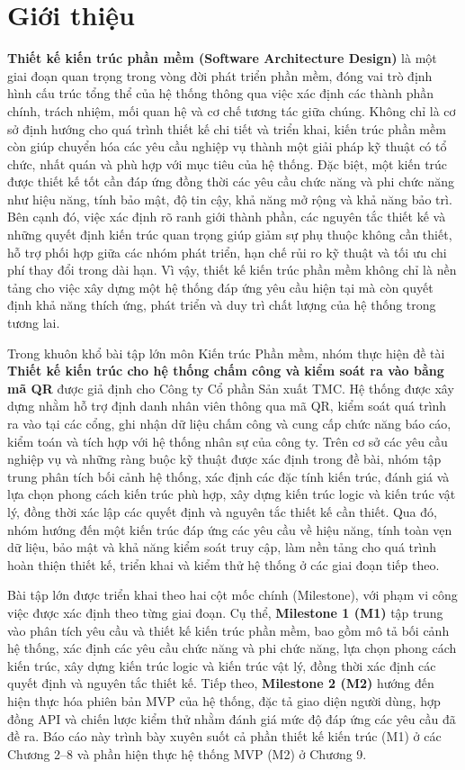 \section{Giới thiệu}

\textbf{Thiết kế kiến trúc phần mềm (Software Architecture Design)} là một giai đoạn quan trọng trong vòng đời phát triển phần mềm, đóng vai trò định hình cấu trúc tổng thể của hệ thống thông qua việc xác định các thành phần chính, trách nhiệm, mối quan hệ và cơ chế tương tác giữa chúng. Không chỉ là cơ sở định hướng cho quá trình thiết kế chi tiết và triển khai, kiến trúc phần mềm còn giúp chuyển hóa các yêu cầu nghiệp vụ thành một giải pháp kỹ thuật có tổ chức, nhất quán và phù hợp với mục tiêu của hệ thống. Đặc biệt, một kiến trúc được thiết kế tốt cần đáp ứng đồng thời các yêu cầu chức năng và phi chức năng như hiệu năng, tính bảo mật, độ tin cậy, khả năng mở rộng và khả năng bảo trì. Bên cạnh đó, việc xác định rõ ranh giới thành phần, các nguyên tắc thiết kế và những quyết định kiến trúc quan trọng giúp giảm sự phụ thuộc không cần thiết, hỗ trợ phối hợp giữa các nhóm phát triển, hạn chế rủi ro kỹ thuật và tối ưu chi phí thay đổi trong dài hạn. Vì vậy, thiết kế kiến trúc phần mềm không chỉ là nền tảng cho việc xây dựng một hệ thống đáp ứng yêu cầu hiện tại mà còn quyết định khả năng thích ứng, phát triển và duy trì chất lượng của hệ thống trong tương lai.

Trong khuôn khổ bài tập lớn môn Kiến trúc Phần mềm, nhóm thực hiện đề tài \textbf{Thiết kế kiến trúc cho hệ thống chấm công và kiểm soát ra vào bằng mã QR} được giả định cho Công ty Cổ phần Sản xuất TMC. Hệ thống được xây dựng nhằm hỗ trợ định danh nhân viên thông qua mã QR, kiểm soát quá trình ra vào tại các cổng, ghi nhận dữ liệu chấm công và cung cấp chức năng báo cáo, kiểm toán và tích hợp với hệ thống nhân sự của công ty. Trên cơ sở các yêu cầu nghiệp vụ và những ràng buộc kỹ thuật được xác định trong đề bài, nhóm tập trung phân tích bối cảnh hệ thống, xác định các đặc tính kiến trúc, đánh giá và lựa chọn phong cách kiến trúc phù hợp, xây dựng kiến trúc logic và kiến trúc vật lý, đồng thời xác lập các quyết định và nguyên tắc thiết kế cần thiết. Qua đó, nhóm hướng đến một kiến trúc đáp ứng các yêu cầu về hiệu năng, tính toàn vẹn dữ liệu, bảo mật và khả năng kiểm soát truy cập, làm nền tảng cho quá trình hoàn thiện thiết kế, triển khai và kiểm thử hệ thống ở các giai đoạn tiếp theo.

Bài tập lớn được triển khai theo hai cột mốc chính (Milestone), với phạm vi công việc được xác định theo từng giai đoạn. Cụ thể, \textbf{Milestone 1 (M1)} tập trung vào phân tích yêu cầu và thiết kế kiến trúc phần mềm, bao gồm mô tả bối cảnh hệ thống, xác định các yêu cầu chức năng và phi chức năng, lựa chọn phong cách kiến trúc, xây dựng kiến trúc logic và kiến trúc vật lý, đồng thời xác định các quyết định và nguyên tắc thiết kế. Tiếp theo, \textbf{Milestone 2 (M2)} hướng đến hiện thực hóa phiên bản MVP của hệ thống, đặc tả giao diện người dùng, hợp đồng API và chiến lược kiểm thử nhằm đánh giá mức độ đáp ứng các yêu cầu đã đề ra. Báo cáo này trình bày xuyên suốt cả phần thiết kế kiến trúc (M1) ở các Chương 2--8 và phần hiện thực hệ thống MVP (M2) ở Chương 9.

